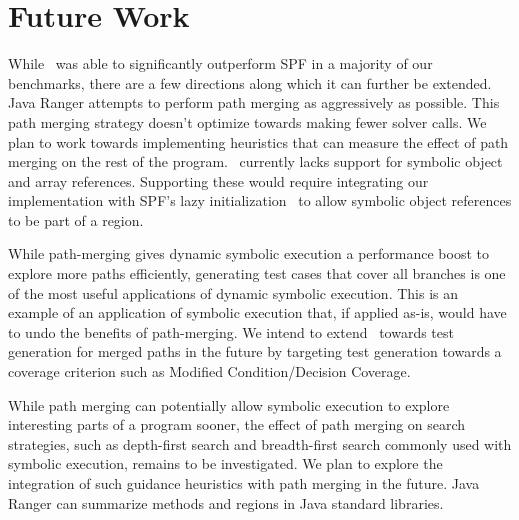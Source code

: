 \section{Future Work}
\label{sec:futureWork}
While \tool\ was able to significantly outperform SPF in a majority of our benchmarks, there are a few directions
along which it can further be extended.
%
Java Ranger attempts to perform path merging as aggressively as possible.
%
This path merging strategy doesn't optimize towards making fewer solver calls.
%
We plan to work towards implementing heuristics that can measure the effect of path merging on the rest of the program.
%
\tool\ currently lacks support for symbolic object and array references.
%
Supporting these would require integrating our implementation with
SPF\rq s lazy initialization~\cite{spf} to allow symbolic object references to be part of a region.

While path-merging gives dynamic symbolic execution a performance boost to explore more paths
efficiently, generating test cases that cover all branches is one of the most useful applications of dynamic
symbolic execution.
%
This is an example of an application of symbolic execution that, if applied as-is, would have to undo the benefits of
path-merging.
%
We intend to extend \tool\ towards test generation for merged paths in the future by targeting test generation
towards a coverage criterion such as Modified Condition/Decision Coverage.

While path merging can potentially allow symbolic execution to explore interesting parts of a program sooner, the
effect of path merging on search strategies, such as depth-first search and breadth-first search commonly used with
symbolic execution, remains to be investigated.
%
We plan to explore the integration of such guidance heuristics with path merging in the future.
%
Java Ranger can summarize methods and regions in Java standard libraries.
%
